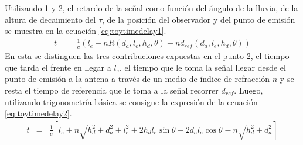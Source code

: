 	Utilizando 1 y 2, el retardo de la señal como función del ángulo de la lluvia, de la altura de decaimiento del $\tau$, de la posición del observador y del punto de emisión se muestra en la ecuación \ref{eq:toytimedelay1}.
	\begin{equation}
	\begin{array}{rcl}
	t & = & \frac{1}{c}\left(l_e+nR(d_a,l_e,h_d,\theta)-nd_{ref}(d_a,l_e,h_d,\theta)\right)
	\end{array}
	\label{eq:toytimedelay1}
	\end{equation}
	En esta se distinguen las tres contribuciones expuestas en el punto 2, el tiempo que tarda el frente en llegar a $l_e$, el tiempo que le toma la señal llegar desde el punto de emisión a la antena a través de un medio de índice de refracción $n$ y se resta el tiempo de referencia que le toma a la señal recorrer $d_{ref}$.
	Luego, utilizando trigonometría básica se consigue la expresión de la ecuación \ref{eq:toytimedelay2}.
	\begin{equation}
	\begin{array}{rcl}
	t & =  & 
	 \frac{1}{c}\left[l_e +
		n \sqrt{h_d^2+d_a^2+l_e^2+2h_dl_e \sin\theta - 2d_al_e\cos\theta} 
		-
		n \sqrt{h_d^2+d_a^2}
		\right]
	\end{array}
	\label{eq:toytimedelay2}
	\end{equation}
	
